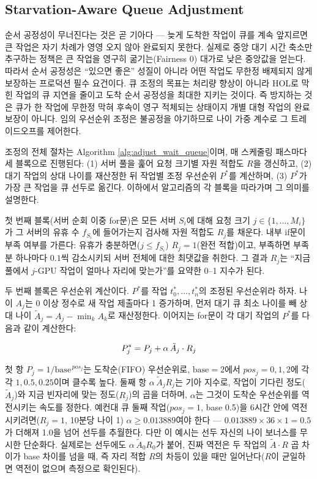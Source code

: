 \documentclass{ieeetj}
\begin{document}
\subsection{Starvation-Aware Queue Adjustment}
순서 공정성이 무너진다는 것은 곧 기아다 --- 늦게 도착한 작업이 큐를 계속 앞지르면 큰 작업은 자기 차례가 영영 오지 않아 완료되지 못한다. 실제로 중앙 대기 시간 축소만 추구하는 정책은 큰 작업을 영구히 굶기는(Fairness 0) 대가로 낮은 중앙값을 얻는다. 따라서 순서 공정성은 ``있으면 좋은'' 성질이 아니라 어떤 작업도 무한정 배제되지 않게 보장하는 프로덕션 필수 요건이다. 큐 조정의 목표는 처리량 향상이 아니라 HOL로 막힌 작업의 큐 지연을 줄이고 도착 순서 공정성을 최대한 지키는 것이다. 즉 방지하는 것은 큐가 한 작업에 무한정 막혀 후속이 영구 적체되는 상태이지 개별 대형 작업의 완료 보장이 아니다. 임의 우선순위 조정은 불공정을 야기하므로 나이 가중 계수로 그 트레이드오프를 제어한다.

조정의 전체 절차는 Algorithm \ref{alg:adjust_wait_queue}이며, 매 스케줄링 패스마다 세 블록으로 진행된다: (1) 서버 풀을 훑어 요청 크기별 자원 적합도 $R$을 갱신하고, (2) 대기 작업의 상대 나이를 재산정한 뒤 작업별 조정 우선순위 $P^*$를 계산하며, (3) $P^*$가 가장 큰 작업을 큐 선두로 옮긴다. 이하에서 알고리즘의 각 블록을 따라가며 그 의미를 설명한다.

첫 번째 블록(서버 순회 이중 for문)은 모든 서버 $S_i$에 대해 요청 크기 $j\in\{1,\dots,M_i\}$가 그 서버의 유휴 수 $f_{S_i}$에 들어가는지 검사해 자원 적합도 $R_j$를 채운다. 내부 if문이 부족 여부를 가른다: 유휴가 충분하면($j\le f_{S_i}$) $R_j=1$(완전 적합)이고, 부족하면 부족분 하나마다 $0.1$씩 감소시키되 서버 전체에 대한 최댓값을 취한다. 그 결과 $R_j$는 ``지금 풀에서 $j$-GPU 작업이 얼마나 자리에 맞는가''를 요약한 0--1 지수가 된다.

두 번째 블록은 우선순위 계산이다. $P^*$를 작업 $t_0^*,\dots,t_n^*$의 조정된 우선순위라 하자. 나이 $A_j$는 0 이상 정수로 새 작업 제출마다 1 증가하며, 먼저 대기 큐 최소 나이를 빼 상대 나이 $\tilde A_j=A_j-\min_k A_k$로 재산정한다. 이어지는 for문이 각 대기 작업의 $P^*$를 다음과 같이 계산한다:

\begin{equation}
P^*_j = P_j + \alpha\, \tilde A_j \cdot R_j
\label{eq:01}
\vspace{2pt}
\end{equation}

첫 항 $P_j=1/\text{base}^{\,pos_j}$는 도착순(FIFO) 우선순위로, $\text{base}=2$에서 $pos_j=0,1,2$에 각각 $1,0.5,0.25$이며 클수록 높다. 둘째 항 $\alpha\,\tilde A_j R_j$는 기아 지수로, 작업이 기다린 정도($\tilde A_j$)와 지금 빈자리에 맞는 정도($R_j$)의 곱을 더하며, $\alpha$는 그것이 도착순 우선순위를 역전시키는 속도를 정한다. 예컨대 큐 둘째 작업($pos_j=1$, base 0.5)을 6시간 안에 역전시키려면($R_j=1$, 10분당 나이 1) $\alpha\ge0.013889$여야 한다 --- $0.013889\times36\times1=0.5$가 더해져 1.0을 넘어 선두를 추월한다. 다만 이 예시는 선두 자신의 나이 보너스를 무시한 단순화다. 실제로는 선두에도 $\alpha\,\tilde A_0 R_0$가 붙어, 진짜 역전은 두 작업의 $\tilde A\cdot R$ 곱 차이가 base 차이를 넘을 때, 즉 자리 적합 $R$의 차등이 있을 때만 일어난다($R$이 균일하면 역전이 없으며 측정으로 확인된다).
\end{document}
